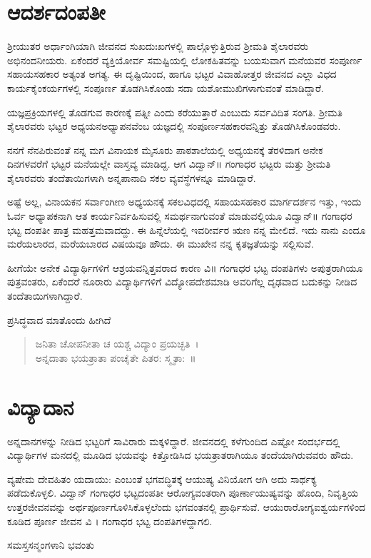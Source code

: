 {\section*{ಆದರ್ಶದಂಪತೀ}
\vskip -6pt

ಶ್ರೀಯುತರ ಅರ್ಧಾಂಗಿಯಾಗಿ ಜೀವನದ ಸುಖ\enginline{-}ದುಃಖಗಳಲ್ಲಿ ಪಾಲ್ಗೊಳ್ಳುತ್ತಿರುವ ಶ್ರೀಮತಿ ಶೈಲಾರವರು ಅಭಿನಂದನೀಯರು. ಏಕೆಂದರೆ ವ್ಯಕ್ತಿಯೋರ್ವ ಸಮಷ್ಟಿಯಲ್ಲಿ ಲೋಕಹಿತವನ್ನು ಬಯಸುವಾಗ ಮನೆಯವರ ಸಂಪೂರ್ಣ ಸಹಾಯ\enginline{-}ಸಹಕಾರ ಅತ್ಯಂತ ಅಗತ್ಯ. ಈ ದೃಷ್ಟಿಯಿಂದ, ಹಾಗೂ ಭಟ್ಟರ ವಿವಾಹೋತ್ತರ ಜೀವನದ ಎಲ್ಲಾ ವಿಧದ ಕಾರ್ಯಕೈಂಕರ್ಯಗಳಲ್ಲಿ ಸಂಪೂರ್ಣ ತೊಡಗಿಸಿಕೊಂಡು ಸದಾ ಯಶೋಮುಖಿಗಳಾಗುವಂತೆ ಮಾಡಿದ್ದಾರೆ. 

ಯಜ್ಞಪ್ರಕ್ರಿಯಗಳಲ್ಲಿ ತೊಡಗುವ ಕಾರಣಕ್ಕೆ ಪತ್ನೀ ಎಂದು ಕರೆಯುತ್ತಾರೆ ಎಂಬುದು ಸರ್ವವಿದಿತ ಸಂಗತಿ. ಶ್ರೀಮತಿ ಶೈಲಾರವರು ಭಟ್ಟರ ಅಧ್ಯಯನ\enginline{-}ಅಧ್ಯಾಪನವೆಂಬ ಯಜ್ಞದಲ್ಲಿ ಸಂಪೂರ್ಣಸಹಕಾರವನ್ನಿತ್ತು ತೊಡಗಿಸಿಕೊಂಡವರು. 									

ನನಗೆ ನೆನಪಿರುವಂತೆ ನನ್ನ ಮಗ ವಿನಾಯಕ ಮೈಸೂರು ಪಾಠಶಾಲೆಯಲ್ಲಿ ಅಧ್ಯಯ\-ನಕ್ಕೆ ತೆರಳಿದಾಗ ಅನೇಕ ದಿನಗಳವರೆಗೆ ಭಟ್ಟರ ಮನೆಯಲ್ಲೇ ವಾಸ್ತವ್ಯ ಮಾಡಿದ್ದ. ಆಗ ವಿದ್ವಾನ್॥ ಗಂಗಾಧರ ಭಟ್ಟರು ಮತ್ತು ಶ್ರೀಮತಿ ಶೈಲಾರವರು ತಂದೆ\enginline{-}ತಾಯಿಗಳಾಗಿ ಅನ್ನಪಾನಾದಿ ಸಕಲ ವ್ಯವಸ್ಥೆಗಳನ್ನೂ ಮಾಡಿದ್ದಾರೆ. 

ಅಷ್ಟೆ ಅಲ್ಲ, ವಿನಾಯಕನ ಸರ್ವಾಂಗೀಣ ಅಧ್ಯಯನಕ್ಕೆ ಸಕಲವಿಧದಲ್ಲಿ ಸಹಾಯ\enginline{-}ಸಹಕಾರ  \enginline{-}  ಮಾರ್ಗ\-ದರ್ಶನ ಇತ್ತು, ಇಂದು ಓರ್ವ ಅಧ್ಯಾಪಕನಾಗಿ ಆತ ಕಾರ್ಯ\-ನಿರ್ವಹಿಸುವಲ್ಲಿ ಸಮರ್ಥನಾಗುವಂತೆ ಮಾಡುವಲ್ಲಿಯೂ ವಿದ್ವಾನ್॥ ಗಂಗಾಧರ ಭಟ್ಟ ದಂಪತೀ ಪಾತ್ರ ಮಹತ್ತಮವಾದದ್ದು. ಈ ಹಿನ್ನೆಲೆಯಲ್ಲಿ ಇವರೀರ್ವರ ಋಣ ನನ್ನ ಮೇಲಿದೆ. ಇದು ನಾನು ಎಂದೂ ಮರೆಯಲಾರದ, ಮರೆಯಬಾರದ ವಿಷಯವೂ ಹೌದು. ಈ ಮುಖೇನ ನನ್ನ ಕೃತಜ್ಞತೆಯನ್ನು ಸಲ್ಲಿಸುವೆ. 

ಹೀಗೆಯೇ ಅನೇಕ ವಿದ್ಯಾರ್ಥಿಗಳಿಗೆ ಆಶ್ರಯವನ್ನಿತ್ತವರಾದ ಕಾರಣ ವಿ॥ ಗಂಗಾಧರ ಭಟ್ಟ ದಂಪತಿಗಳು ಅಪುತ್ರರಾಗಿಯೂ ಪುತ್ರವಂತರು, ಏಕೆಂದರೆ ನೂರಾರು ವಿದ್ಯಾರ್ಥಿ\-ಗಳಿಗೆ ವಿದ್ಯೋಪದೇಶಮಾಡಿ ಅವರಿಗೆಲ್ಲ ದೃಢವಾದ ಬದುಕನ್ನು ನೀಡಿದ ತಂದೆತಾಯಿಗಳಾಗಿದ್ದಾರೆ. 

ಪ್ರಸಿದ್ಧವಾದ ಮಾತೊಂದು ಹೀಗಿದೆ  \enginline{-}   
\begin{verse}
ಜನಿತಾ ಚೋಪನೀತಾ ಚ ಯಶ್ಚ ವಿದ್ಯಾಂ ಪ್ರಯಚ್ಛತಿ~।\\
ಅನ್ನದಾತಾ ಭಯತ್ರಾತಾ ಪಂಚೈತೇ ಪಿತರ: ಸ್ಮೃತಾ:~॥ 		
\end{verse}

\section*{ವಿದ್ಯಾದಾನ} 

ಅನ್ನದಾನಗಳನ್ನು ನೀಡಿದ ಭಟ್ಟರಿಗೆ ಸಾವಿರಾರು ಮಕ್ಕಳಿದ್ದಾರೆ. ಜೀವನದಲ್ಲಿ ಕಳೆಗುಂದಿದ ಎಷ್ಟೋ ಸಂದರ್ಭದಲ್ಲಿ ವಿದ್ಯಾರ್ಥಿಗಳ ಮನದಲ್ಲಿ ಮೂಡಿದ ಭಯವನ್ನು ಕಿತ್ತೋಡಿಸಿದ ಭಯತ್ರಾತರಾಗಿಯೂ ತಂದೆಯಾಗಿರುವವರು ಹೌದು.

ವ್ಯಷೇಮ ದೇವಹಿತಂ ಯದಾಯು: ಎಂಬಂತೆ ಭಗವದ್ಧಿತಕ್ಕೆ ಆಯುಷ್ಯ \hbox{ವಿನಿಯೋಗ}  ಆಗಿ ಅದು ಸಾರ್ಥಕ್ಯ ಪಡೆದುಕೊಳ್ಳಲಿ. ವಿದ್ವಾನ್ ಗಂಗಾಧರ ಭಟ್ಟದಂಪತೀ ಆರೋಗ್ಯ\-ವಂತರಾಗಿ ಪೂರ್ಣಾಯುಷ್ಯವನ್ನು ಹೊಂದಿ, ನಿವೃತ್ತಿಯ ಉತ್ತರಜೀವನವನ್ನು ಅರ್ಥಪೂರ್ಣಗೊಳಿಸಿಕೊಳ್ಳಲೆಂದು ಭಗವಂತನಲ್ಲಿ ಪ್ರಾರ್ಥಿಸುವೆ. ಆಯುರಾರೋಗ್ಯ\enginline{-}\break ಐಶ್ವರ್ಯಗಳಿಂದ ಕೂಡಿದ ಪೂರ್ಣ ಜೀವನ ವಿ ।  ಗಂಗಾಧರ ಭಟ್ಟ ದಂಪತಿಗಳದ್ದಾಗಲಿ. 

\centerline{ಸಮಸ್ತಸನ್ಮಂಗಳಾನಿ ಭವಂತು}

\articleend
}

